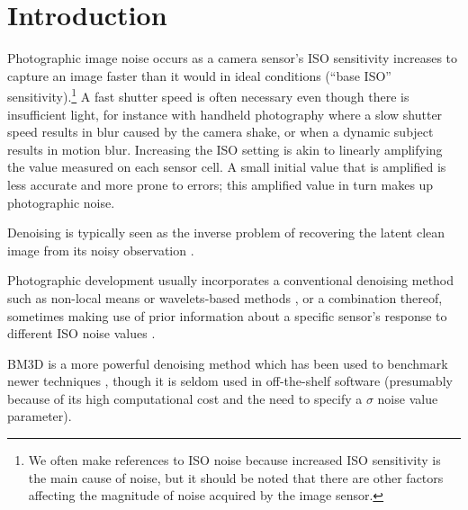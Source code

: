 \chapter{Introduction}\label{chap:Introduction}

Photographic image noise occurs as a camera sensor's ISO sensitivity increases to capture an image faster than it would in ideal conditions (``base ISO'' sensitivity).\footnote{We often make references to ISO noise because increased ISO sensitivity is the main cause of noise, but it should be noted that there are other factors affecting the magnitude of noise acquired by the image sensor.} A fast shutter speed is often necessary even though there is insufficient light, for instance with handheld photography where a slow shutter speed results in blur caused by the camera shake, or when a dynamic subject results in motion blur. Increasing the ISO setting is akin to linearly amplifying the value measured on each sensor cell. A small initial value that is amplified is less accurate and more prone to errors; this amplified value in turn makes up photographic noise. 

Denoising is typically seen as the inverse problem of recovering the latent clean image from its noisy observation \cite{rednet}. 

Photographic development usually incorporates a conventional denoising method such as non-local means \cite{nlm} or wavelets-based methods \cite{wavelets-denoising}, or a combination thereof, sometimes making use of prior information about a specific sensor's response to different ISO noise values \cite{darktable-denoising}.

\acs{BM3D} \cite{bm3d} is a more powerful denoising method which has been used to benchmark newer techniques \cite{sidd}\cite{renoir}\cite{nind-ntire}\cite{learningtoseeinthedark}\cite{noise2noise}\cite{rednet}\cite{darmstadt}\cite{dncnn}\cite{microscopynoise}\cite{lossescomp}, though it is seldom used in off-the-shelf software (presumably because of its high computational cost and the need to specify a $\sigma$ noise value parameter). 

